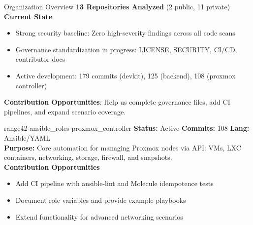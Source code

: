 \documentclass[aspectratio=169]{beamer}
\begin{document}
\begin{frame}{Organization Overview \; \faClipboardCheck}
  \textbf{13 Repositories Analyzed} (2 public, 11 private)\\[3mm]
  
  \textbf{Current State}
  \begin{itemize}
    \item \alert{Strong security baseline}: Zero high-severity findings across all code scans
    \item \alert{Governance standardization in progress}: LICENSE, SECURITY, CI/CD, contributor docs
    \item \alert{Active development}: 179 commits (devkit), 125 (backend), 108 (proxmox controller)
  \end{itemize}
  \vspace{2mm}
  \begin{tcolorbox}
    \faUsers\; \textbf{Contribution Opportunities}: Help us complete governance files, add CI pipelines, and expand scenario coverage.
  \end{tcolorbox}
\end{frame}

\begin{frame}{range42-ansible\_roles-proxmox\_controller \; \faCogs}
  \textbf{Status:} Active \hfill \textbf{Commits:} 108 \hfill \textbf{Lang:} Ansible/YAML\\[2mm]
  \textbf{Purpose:} Core automation for managing Proxmox nodes via API: VMs, LXC containers, networking, storage, firewall, and snapshots.\\[2mm]
  \textbf{Contribution Opportunities}
  \begin{itemize}
    \item Add CI pipeline with ansible-lint and Molecule idempotence tests
    \item Document role variables and provide example playbooks
    \item Extend functionality for advanced networking scenarios
  \end{itemize}
\end{frame}
\end{document}
